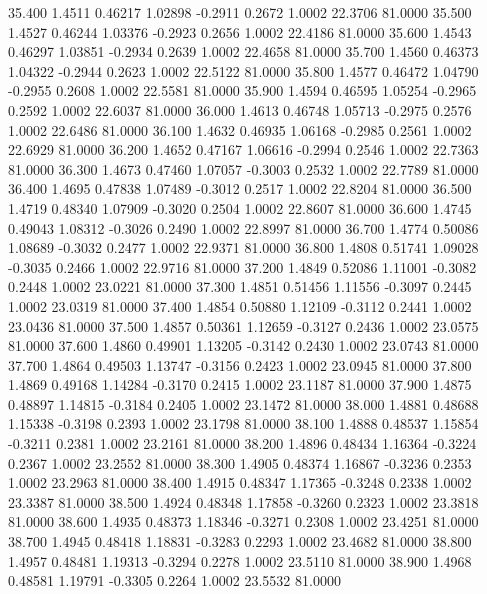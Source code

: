   35.400   1.4511   0.46217   1.02898  -0.2911   0.2672   1.0002  22.3706  81.0000
  35.500   1.4527   0.46244   1.03376  -0.2923   0.2656   1.0002  22.4186  81.0000
  35.600   1.4543   0.46297   1.03851  -0.2934   0.2639   1.0002  22.4658  81.0000
  35.700   1.4560   0.46373   1.04322  -0.2944   0.2623   1.0002  22.5122  81.0000
  35.800   1.4577   0.46472   1.04790  -0.2955   0.2608   1.0002  22.5581  81.0000
  35.900   1.4594   0.46595   1.05254  -0.2965   0.2592   1.0002  22.6037  81.0000
  36.000   1.4613   0.46748   1.05713  -0.2975   0.2576   1.0002  22.6486  81.0000
  36.100   1.4632   0.46935   1.06168  -0.2985   0.2561   1.0002  22.6929  81.0000
  36.200   1.4652   0.47167   1.06616  -0.2994   0.2546   1.0002  22.7363  81.0000
  36.300   1.4673   0.47460   1.07057  -0.3003   0.2532   1.0002  22.7789  81.0000
  36.400   1.4695   0.47838   1.07489  -0.3012   0.2517   1.0002  22.8204  81.0000
  36.500   1.4719   0.48340   1.07909  -0.3020   0.2504   1.0002  22.8607  81.0000
  36.600   1.4745   0.49043   1.08312  -0.3026   0.2490   1.0002  22.8997  81.0000
  36.700   1.4774   0.50086   1.08689  -0.3032   0.2477   1.0002  22.9371  81.0000
  36.800   1.4808   0.51741   1.09028  -0.3035   0.2466   1.0002  22.9716  81.0000
  37.200   1.4849   0.52086   1.11001  -0.3082   0.2448   1.0002  23.0221  81.0000
  37.300   1.4851   0.51456   1.11556  -0.3097   0.2445   1.0002  23.0319  81.0000
  37.400   1.4854   0.50880   1.12109  -0.3112   0.2441   1.0002  23.0436  81.0000
  37.500   1.4857   0.50361   1.12659  -0.3127   0.2436   1.0002  23.0575  81.0000
  37.600   1.4860   0.49901   1.13205  -0.3142   0.2430   1.0002  23.0743  81.0000
  37.700   1.4864   0.49503   1.13747  -0.3156   0.2423   1.0002  23.0945  81.0000
  37.800   1.4869   0.49168   1.14284  -0.3170   0.2415   1.0002  23.1187  81.0000
  37.900   1.4875   0.48897   1.14815  -0.3184   0.2405   1.0002  23.1472  81.0000
  38.000   1.4881   0.48688   1.15338  -0.3198   0.2393   1.0002  23.1798  81.0000
  38.100   1.4888   0.48537   1.15854  -0.3211   0.2381   1.0002  23.2161  81.0000
  38.200   1.4896   0.48434   1.16364  -0.3224   0.2367   1.0002  23.2552  81.0000
  38.300   1.4905   0.48374   1.16867  -0.3236   0.2353   1.0002  23.2963  81.0000
  38.400   1.4915   0.48347   1.17365  -0.3248   0.2338   1.0002  23.3387  81.0000
  38.500   1.4924   0.48348   1.17858  -0.3260   0.2323   1.0002  23.3818  81.0000
  38.600   1.4935   0.48373   1.18346  -0.3271   0.2308   1.0002  23.4251  81.0000
  38.700   1.4945   0.48418   1.18831  -0.3283   0.2293   1.0002  23.4682  81.0000
  38.800   1.4957   0.48481   1.19313  -0.3294   0.2278   1.0002  23.5110  81.0000
  38.900   1.4968   0.48581   1.19791  -0.3305   0.2264   1.0002  23.5532  81.0000

